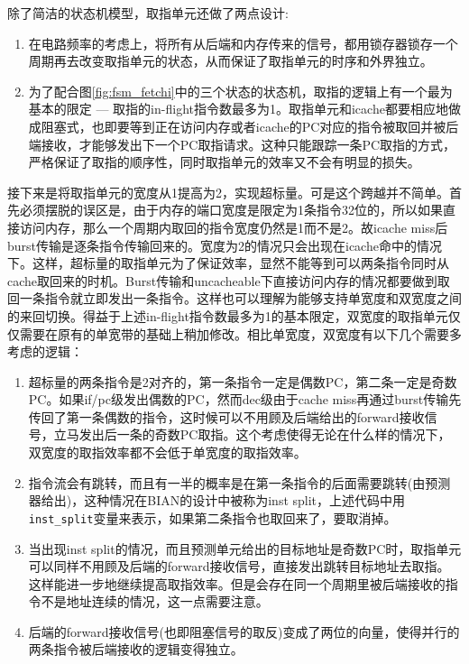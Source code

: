 除了简洁的状态机模型，取指单元还做了两点设计:
\begin{enumerate}[label=(\alph*)]
	\item 在电路频率的考虑上，将所有从后端和内存传来的信号，都用锁存器锁存一个周期再去改变取指单元的状态，从而保证了取指单元的时序和外界独立。
	\item 为了配合图\ref{fig:fsm_fetchi}中的三个状态的状态机，取指的逻辑上有一个最为基本的限定 --- 取指的in-flight指令数最多为1。取指单元和icache都要相应地做成阻塞式，也即要等到正在访问内存或者icache的PC对应的指令被取回并被后端接收，才能够发出下一个PC取指请求。这种只能跟踪一条PC取指的方式，严格保证了取指的顺序性，同时取指单元的效率又不会有明显的损失。
\end{enumerate}

接下来是将取指单元的宽度从1提高为2，实现超标量。可是这个跨越并不简单。首先必须摆脱的误区是，由于内存的端口宽度是限定为1条指令32位的，所以如果直接访问内存，那么一个周期内取回的指令宽度仍然是1而不是2。故icache miss后burst传输是逐条指令传输回来的。宽度为2的情况只会出现在icache命中的情况下。这样，超标量的取指单元为了保证效率，显然不能等到可以两条指令同时从cache取回来的时机。Burst传输和uncacheable下直接访问内存的情况都要做到取回一条指令就立即发出一条指令。这样也可以理解为能够支持单宽度和双宽度之间的来回切换。得益于上述in-flight指令数最多为1的基本限定，双宽度的取指单元仅仅需要在原有的单宽带的基础上稍加修改。相比单宽度，双宽度有以下几个需要多考虑的逻辑：
\begin{enumerate}[label=(\alph*)]
	\item 超标量的两条指令是2对齐的，第一条指令一定是偶数PC，第二条一定是奇数PC。如果if/pc级发出偶数的PC，然而dec级由于cache miss再通过burst传输先传回了第一条偶数的指令，这时候可以不用顾及后端给出的forward接收信号，立马发出后一条的奇数PC取指。这个考虑使得无论在什么样的情况下，双宽度的取指效率都不会低于单宽度的取指效率。
	\item 指令流会有跳转，而且有一半的概率是在第一条指令的后面需要跳转(由预测器给出)，这种情况在BIAN的设计中被称为inst split，上述代码中用\texttt{inst\_split}变量来表示，如果第二条指令也取回来了，要取消掉。
	\item 当出现inst split的情况，而且预测单元给出的目标地址是奇数PC时，取指单元可以同样不用顾及后端的forward接收信号，直接发出跳转目标地址去取指。这样能进一步地继续提高取指效率。但是会存在同一个周期里被后端接收的指令不是地址连续的情况，这一点需要注意。
	\item 后端的forward接收信号(也即阻塞信号的取反)变成了两位的向量，使得并行的两条指令被后端接收的逻辑变得独立。
\end{enumerate}

